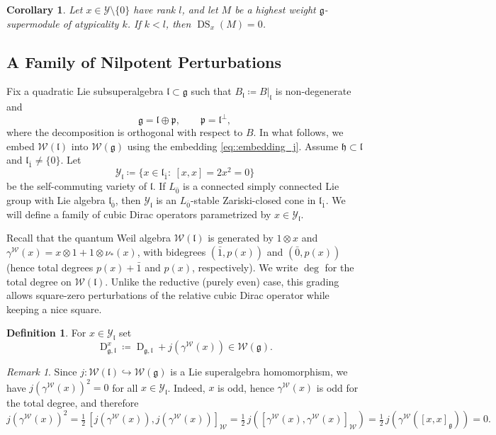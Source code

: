 \documentclass[11pt]{amsart}
\newcommand{\DS}{\operatorname{DS}}
\newcommand{\Dirac}{\operatorname{D}}
\def\WW{{\mathcal{W}}}
\def\Weil{{\mathcal{W}(\gg)}}
\def\deg{{\operatorname{deg}}}
\def\hh{{\mathfrak h}}
\def\pp{{\mathfrak p}}
\def\ll{{\mathfrak l}}
\def\YY{{\mathcal Y}}
\def\pp{{\mathfrak p}}
\def\pp{{\mathfrak{p}}}
\def\gg{{\mathfrak{g}}}
\theoremstyle{plain}
\newtheorem{corollary}[theorem]{Corollary}
\theoremstyle{remark}
\theoremstyle{definition}
\newtheorem{definition}[theorem]{Definition}
\numberwithin{equation}{section}
\theoremstyle{remark}
\newtheorem{remark}[theorem]{Remark}
\begin{document}
\begin{corollary}\label{DSNM}
Let $x\in\YY\setminus\{0\}$ have rank $l$, and let $M$ be a highest weight $\gg$-supermodule of atypicality $k$.
If $k<l$, then $\DS_x(M)=0$.
\end{corollary}

\subsection{A Family of Nilpotent Perturbations}
Fix a quadratic Lie subsuperalgebra $\ll\subset\gg$ such that $B_{\ll}\coloneqq B|_{\ll}$ is non-degenerate and
\begin{equation}
 \gg=\ll\oplus\pp,\qquad \pp=\ll^{\perp},
\end{equation}
where the decomposition is orthogonal with respect to $B$. In what follows, we embed $\WW(\ll)$ into $\Weil$ using the embedding \eqref{eq::embedding_j}. Assume $\hh\subset\ll$ and $\ll_{\bar 1}\neq\{0\}$. Let
\begin{equation}
 \YY_{\ll}\coloneqq \{x\in\ll_{\bar 1}:\ [x,x]=2x^{2}=0\}
\end{equation}
be the self-commuting variety of $\ll$. If $L_{\bar 0}$ is a connected simply connected Lie group with Lie algebra $\ll_{\bar 0}$, then $\YY_{\ll}$
is an $L_{\bar 0}$-stable Zariski-closed cone in $\ll_{\bar 1}$. We will define a family of cubic Dirac operators parametrized by
$x\in\YY_{\ll}$.

Recall that the quantum Weil algebra $\WW(\ll)$ is generated by $1\otimes x$ and $\gamma^{\WW}(x)=x\otimes 1+1\otimes \nu_{*}(x)$,
with bidegrees $(\bar 1,p(x))$ and $(\bar 0,p(x))$ (hence total degrees $p(x)+\bar 1$ and $p(x)$, respectively). We write $\deg$
for the total degree on $\WW(\ll)$. Unlike the reductive (purely even) case, this grading allows square-zero perturbations of the
relative cubic Dirac operator while keeping a nice square.

\begin{definition}
For $x\in\YY_{\ll}$ set $$\Dirac^{x}_{\gg,\ll}\coloneqq \Dirac_{\gg,\ll}+j(\gamma^{\WW}(x))\in\Weil.$$
\end{definition}

\begin{remark}\label{rmk::square_gamma_W_x}
Since $j:\WW(\ll)\hookrightarrow \Weil$ is a Lie superalgebra homomorphism, we have $j(\gamma^{\WW}(x))^{2}=0$ for all
$x\in\YY_{\ll}$. Indeed, $x$ is odd, hence $\gamma^{\WW}(x)$ is odd for the total degree, and therefore
\[
j(\gamma^{\WW}(x))^{2}=\tfrac12\,[j(\gamma^{\WW}(x)),j(\gamma^{\WW}(x))]_{\WW}
=\tfrac12\,j([\gamma^{\WW}(x),\gamma^{\WW}(x)]_{\WW})
=\tfrac12\,j(\gamma^{\WW}([x,x]_{\gg}))=0.
\]
\end{remark}
\end{document}
